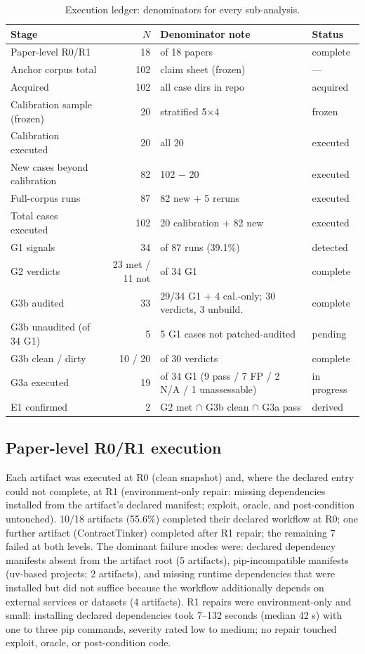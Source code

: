 \documentclass[11pt]{article}
\begin{document}
\begin{table}[h]
\centering
\caption{Execution ledger: denominators for every sub-analysis.}
\label{tab:execution}
\footnotesize
\begin{tabular}{@{}lrll@{}}
\toprule
Stage & $N$ & Denominator note & Status \\
\midrule
Paper-level R0/R1 & 18 & of 18 papers & complete \\
Anchor corpus total & 102 & claim sheet (frozen) & --- \\
Acquired & 102 & all case dirs in repo & acquired \\
Calibration sample (frozen) & 20 & stratified 5$\times$4 & frozen \\
Calibration executed & 20 & all 20 & executed \\
New cases beyond calibration & 82 & 102 $-$ 20 & executed \\
Full-corpus runs & 87 & 82 new + 5 reruns & executed \\
Total cases executed & 102 & 20 calibration + 82 new & executed \\
G1 signals & 34 & of 87 runs (39.1\%) & detected \\
G2 verdicts & 23 met / 11 not & of 34 G1 & complete \\
G3b audited & 33 & 29/34 G1 + 4 cal.-only; 30 verdicts, 3 unbuild. & complete \\
G3b unaudited (of 34 G1) & 5 & 5 G1 cases not patched-audited & pending \\
G3b clean / dirty & 10 / 20 & of 30 verdicts & complete \\
G3a executed & 19 & of 34 G1 (9 pass / 7 FP / 2 N/A / 1 unassessable) & in progress \\
E1 confirmed & 2 & G2 met $\cap$ G3b clean $\cap$ G3a pass & derived \\
\bottomrule
\end{tabular}
\end{table}

\subsection{Paper-level R0/R1 execution}
\label{sec:paperlevel-results}
Each artifact was executed at R0 (clean snapshot) and, where the declared entry could not complete, at R1 (environment-only repair: missing dependencies installed from the artifact's declared manifest; exploit, oracle, and post-condition untouched). 10/18 artifacts (55.6\%) completed their declared workflow at R0; one further artifact (ContractTinker) completed after R1 repair; the remaining 7 failed at both levels. The dominant failure modes were: declared dependency manifests absent from the artifact root (5 artifacts), pip-incompatible manifests (uv-based projects; 2 artifacts), and missing runtime dependencies that were installed but did not suffice because the workflow additionally depends on external services or datasets (4 artifacts). R1 repairs were environment-only and small: installing declared dependencies took 7--132 seconds (median 42 s) with one to three pip commands, severity rated low to medium; no repair touched exploit, oracle, or post-condition code.
\end{document}
